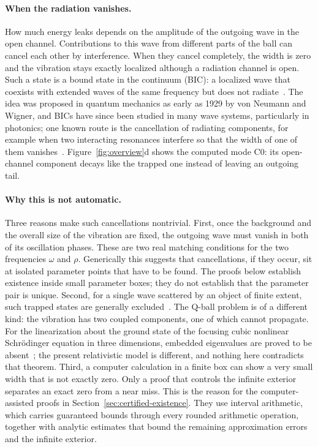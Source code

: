 \paragraph{When the radiation vanishes.}
How much energy leaks depends on the amplitude of the outgoing wave in
the open channel. Contributions to this wave from different parts of
the ball can cancel each other by interference. When they cancel
completely, the width is zero and the vibration stays exactly localized
although a radiation channel is open. Such a state is a bound state in
the continuum (BIC): a localized wave that coexists with extended waves
of the same frequency but does not radiate~\cite{Hsu2016}. The idea was
proposed in quantum mechanics as early as 1929 by von Neumann and
Wigner, and BICs have since been studied in many wave systems,
particularly in photonics; one known route is the cancellation of
radiating components, for example when two interacting resonances
interfere so that the width of one of them
vanishes~\cite{Hsu2016,FriedrichWintgen1985}.
Figure~\ref{fig:overview}d shows the computed mode C0: its open-channel
component decays like the trapped one instead of leaving an outgoing
tail.

\paragraph{Why this is not automatic.}
Three reasons make such cancellations nontrivial. First, once the
background and the overall size of the vibration are fixed, the outgoing
wave must vanish in both of its oscillation phases. These are two real
matching conditions for the two frequencies $\omega$ and $\rho$.
Generically this suggests that cancellations, if they occur, sit at
isolated parameter points that have to be found. The proofs below
establish existence inside small parameter boxes; they do not establish
that the parameter pair is unique. Second, for a single wave scattered
by an object of finite extent, such trapped states are generally
excluded~\cite{Hsu2016}. The Q-ball problem is of a different kind: the
vibration has two coupled components, one of which cannot propagate.
For the linearization about the ground state of the focusing cubic
nonlinear Schr\"odinger equation in three dimensions, embedded
eigenvalues are proved to be absent~\cite{LiYang2026}; the present
relativistic model is different, and nothing here contradicts that
theorem. Third, a computer calculation in a finite box can show a very
small width that is not exactly zero. Only a proof that controls the
infinite exterior separates an exact zero from a near miss. This is the
reason for the computer-assisted proofs in
Section~\ref{sec:certified-existence}. They use interval arithmetic,
which carries guaranteed bounds through every rounded arithmetic
operation, together with analytic estimates that bound the remaining
approximation errors and the infinite exterior.

